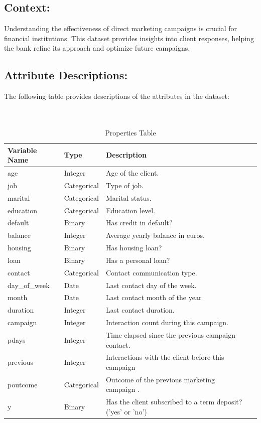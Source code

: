 \documentclass{article}
\begin{document}
\subsection{Context:}
Understanding the effectiveness of direct marketing campaigns is crucial for financial institutions. This dataset provides insights into client responses, helping the bank refine its approach and optimize future campaigns.

\subsection{Attribute Descriptions: }
The following table provides descriptions of the attributes in the dataset: \\
\\
\\

\begin{table}
\centering 
\begin{tabular}{|l|l|l|l|}
\hline
\textbf{Variable Name} & \textbf{Type} & \textbf{Description}  \\
\hline
\hline
age & Integer & Age of the client. \\
job & Categorical & Type of job.   \\
marital & Categorical & Marital status.  \\
education & Categorical & Education level.  \\
default & Binary & Has credit in default?  \\
balance & Integer & Average yearly balance in euros. \\
housing & Binary & Has housing loan?  \\
loan & Binary & Has a personal loan?   \\
contact & Categorical & Contact communication type. \\
day\_of\_week & Date & Last contact day of the week.\\
month & Date & Last contact month of the year  \\
duration & Integer & Last contact duration. \\
campaign & Integer &  Interaction count during this campaign.  \\
pdays & Integer &Time elapsed since the previous campaign contact.  \\
previous & Integer &Interactions with the client before this campaign   \\
poutcome & Categorical & Outcome of the previous marketing campaign .  \\
y & Binary & Has the client subscribed to a term deposit? ('yes' or 'no') \\
\hline
\hline
\end{tabular}
\caption{Properties Table}
\end{table}
\end{document}
